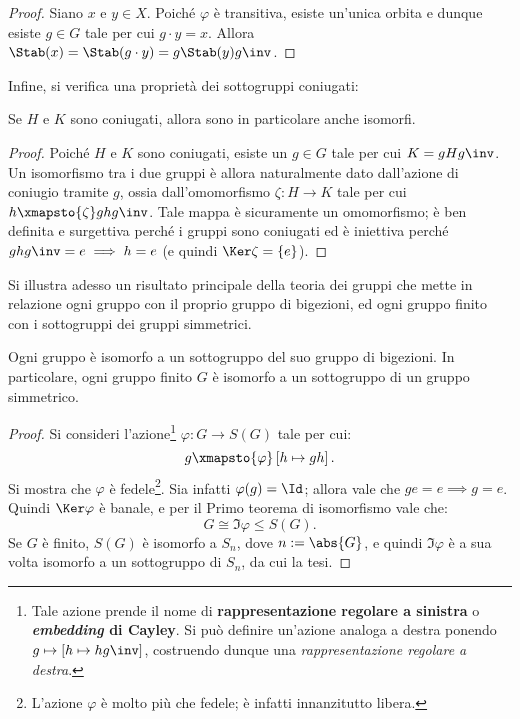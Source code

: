 \documentclass[12pt]{scrartcl}
\begin{document}
	\begin{proof}
		Siano $x$ e $y \in X$. Poiché $\varphi$ è transitiva, esiste un'unica orbita
		e dunque esiste $g \in G$ tale per cui $g \cdot y = x$. Allora
		$\Stab(x) = \Stab(g \cdot y) = g \Stab(y) g\inv$.
	\end{proof}
	
	Infine, si verifica una proprietà dei sottogruppi coniugati:
	
	\begin{proposition}
		Se $H$ e $K$ sono coniugati, allora sono in particolare anche isomorfi.
	\end{proposition}
	
	\begin{proof}
		Poiché $H$ e $K$ sono coniugati, esiste un $g \in G$ tale per cui
		$K = gHg\inv$.
		Un isomorfismo tra i due gruppi è allora naturalmente dato dall'azione di
		coniugio tramite $g$, ossia dall'omomorfismo $\zeta : H \to K$
		tale per cui $h \xmapsto{\zeta} ghg\inv$. Tale mappa è sicuramente un omomorfismo;
		è ben definita e surgettiva perché i gruppi sono coniugati ed è iniettiva
		perché $ghg\inv = e \implies h = e$ (e quindi $\Ker \zeta = \{e\}$).
	\end{proof}
	
	\bigskip
	
	Si illustra adesso un risultato principale della teoria dei gruppi che mette in
	relazione ogni gruppo con il proprio gruppo di bigezioni, ed ogni gruppo finito con i
	sottogruppi dei gruppi simmetrici.
	
	\begin{theorem}[di Cayley]
		Ogni gruppo è isomorfo a un sottogruppo del suo gruppo di bigezioni.
		In particolare, ogni gruppo finito $G$ è isomorfo a un sottogruppo di un gruppo
		simmetrico.
	\end{theorem}
	
	\begin{proof}
		Si consideri l'azione\footnote{Tale azione prende il nome di \textbf{rappresentazione regolare a sinistra} o \textbf{\textit{embedding} di Cayley}.
		Si può definire un'azione analoga a destra ponendo $g \mapsto \left[ h \mapsto hg\inv \right]$,
		costruendo dunque una \textit{rappresentazione regolare a destra}.} $\varphi : G \to S(G)$ tale per cui:
		\[ g \xmapsto{\varphi} \left[ h \mapsto gh \right]. \]
		Si mostra che $\varphi$ è fedele\footnote{L'azione $\varphi$ è molto
		più che fedele; è infatti innanzitutto libera.}. Sia infatti $\varphi(g) = \Id$; allora
		vale che $ge = e \implies g = e$. Quindi $\Ker \varphi$ è banale, e per il
		Primo teorema di isomorfismo vale che:
		\[ G \cong \Im \varphi \leq S(G). \]
		Se $G$ è finito, $S(G)$ è isomorfo a $S_n$, dove $n := \abs{G}$, e quindi
		$\Im \varphi$ è a sua volta isomorfo a un sottogruppo di $S_n$, da cui
		la tesi.
	\end{proof}
	
\end{document}
